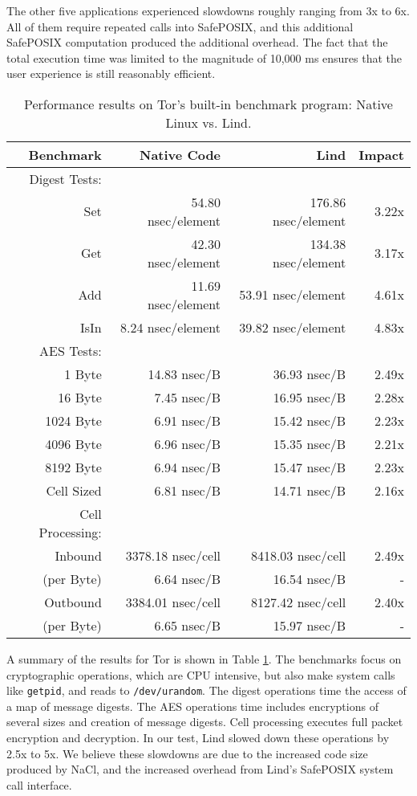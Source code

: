 {{{The other five applications experienced slowdowns roughly ranging from 3x to 6x.
All of them require repeated calls into SafePOSIX, and this additional SafePOSIX
computation produced the additional overhead. 
The fact that the total execution time was limited 
to the magnitude of 10,000 ms ensures that the 
user experience is still reasonably efficient.

\begin{table}
\centering
\scriptsize
\begin{tabular}{|r|r|r|r|}
  \hline
  {\bf Benchmark} & {\bf Native Code} & {\bf Lind} & {\bf Impact}  \\
  \hline
  Digest Tests: & & & \\
  Set & 54.80 nsec/element & 176.86 nsec/element & 3.22x \\
  Get & 42.30 nsec/element & 134.38 nsec/element & 3.17x \\
  Add & 11.69 nsec/element & 53.91 nsec/element & 4.61x \\
  IsIn & 8.24 nsec/element & 39.82 nsec/element & 4.83x \\
  \hline
  AES Tests: & & & \\
  1 Byte & 14.83 nsec/B & 36.93 nsec/B & 2.49x \\
  16 Byte & 7.45 nsec/B & 16.95 nsec/B & 2.28x \\
  1024 Byte & 6.91 nsec/B & 15.42 nsec/B & 2.23x \\
  4096 Byte & 6.96 nsec/B & 15.35 nsec/B & 2.21x \\
  8192 Byte & 6.94 nsec/B & 15.47 nsec/B & 2.23x \\
  Cell Sized & 6.81 nsec/B & 14.71 nsec/B & 2.16x \\
  \hline
  Cell Processing: & & & \\
  Inbound & 3378.18 nsec/cell & 8418.03 nsec/cell & 2.49x \\
  (per Byte) & 6.64 nsec/B & 16.54 nsec/B & - \\
  Outbound & 3384.01 nsec/cell & 8127.42 nsec/cell & 2.40x \\
  (per Byte) & 6.65 nsec/B & 15.97 nsec/B & - \\
  \hline
\end{tabular}
\caption{\small Performance results on Tor's built-in benchmark program: Native
Linux vs. Lind.}
\label{table:performance_tor}
\end{table}

A summary of the results for Tor is shown in Table \ref{table:performance_tor}. The
benchmarks focus on cryptographic operations,
which are CPU intensive, but also make system calls like \texttt{getpid}, and reads to
\texttt{/dev/urandom}.
The digest operations time the access of a map of message digests.
The AES operations time includes encryptions of several sizes and creation of
message digests. Cell processing executes full packet encryption and decryption. In our
test, Lind slowed down these operations by 2.5x to 5x. We believe these
slowdowns are due to the increased code size produced by NaCl,
and the increased overhead from Lind's SafePOSIX system call interface.

}}}
